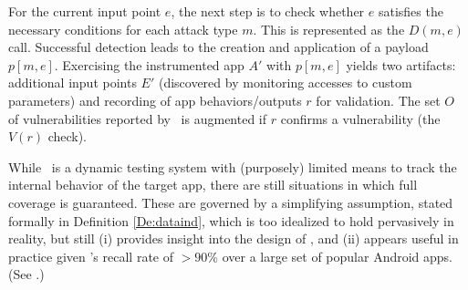 \begin{algorithm}[t]
	\DontPrintSemicolon
	\;
	\;
	\;
	\caption{\label{Al:maalg}{\bf Outline of the Core \Tool\ Algorithm, where $D$, $M$, $V$ and $I$ Denote Detection, Mutation, Validation and Instrumentation, Respectively}}
\end{algorithm}


For the current input point $e$, the next step is to check whether $e$ satisfies the necessary conditions for each attack type $m$. This is represented as the $D(m,e)$ call. Successful detection leads to the creation and application of a payload $p[m,e]$. Exercising the instrumented app $A'$ with $p[m,e]$ yields two artifacts: additional input points $E'$ (discovered by monitoring accesses to custom parameters) and recording of app behaviors/outputs $r$ for validation. The set $O$ of vulnerabilities reported by \Tool\ is augmented if $r$ confirms a vulnerability (the $V(r)$ check).

While \Tool\ is a dynamic testing system with (purposely) limited means to track the internal behavior of the target app, there are still situations in which full coverage is guaranteed. These are governed by a simplifying assumption, stated formally in Definition \ref{De:dataind}, which is too idealized to hold pervasively in reality, but still (i) provides insight into the design of \Tool, and (ii) appears useful in practice given \Tool's recall rate of $>90\%$ over a large set of popular Android apps. (See .)


